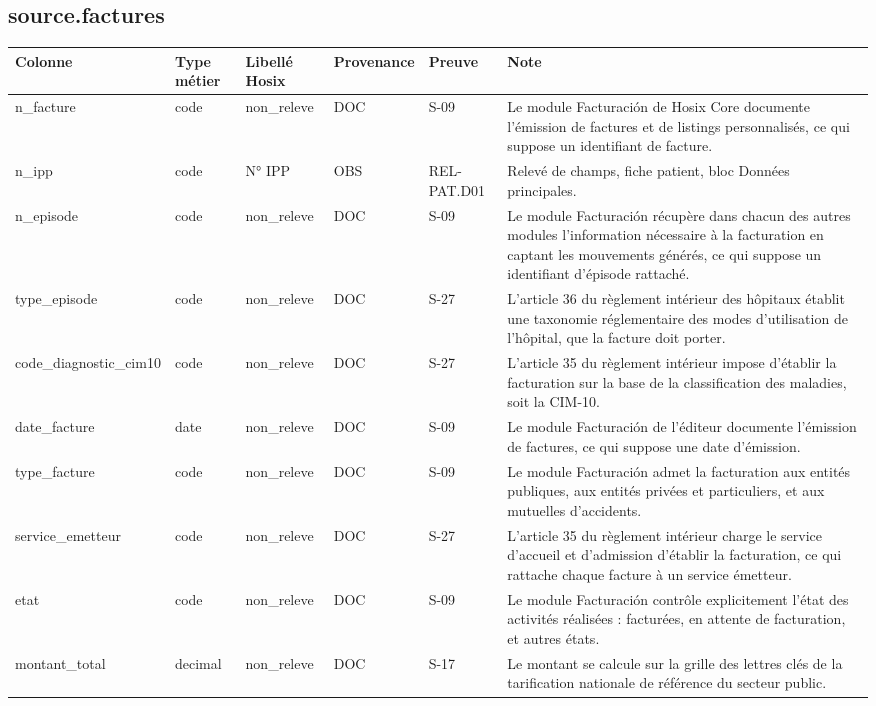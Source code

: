 \subsection*{source.factures}
\begin{longtable}{p{2.5cm}p{1.8cm}p{2.8cm}p{1.3cm}p{2.2cm}p{5cm}}
\hline
Colonne & Type métier & Libellé Hosix & Provenance & Preuve & Note \\
\hline
\endhead
n\_facture & code & non\_releve & DOC & S-09 & Le module Facturación de Hosix Core documente l'émission de factures et de listings personnalisés, ce qui suppose un identifiant de facture. \\
n\_ipp & code & N° IPP & OBS & REL-PAT.D01 & Relevé de champs, fiche patient, bloc Données principales. \\
n\_episode & code & non\_releve & DOC & S-09 & Le module Facturación récupère dans chacun des autres modules l'information nécessaire à la facturation en captant les mouvements générés, ce qui suppose un identifiant d'épisode rattaché. \\
type\_episode & code & non\_releve & DOC & S-27 & L'article 36 du règlement intérieur des hôpitaux établit une taxonomie réglementaire des modes d'utilisation de l'hôpital, que la facture doit porter. \\
code\_diagnostic\_cim10 & code & non\_releve & DOC & S-27 & L'article 35 du règlement intérieur impose d'établir la facturation sur la base de la classification des maladies, soit la CIM-10. \\
date\_facture & date & non\_releve & DOC & S-09 & Le module Facturación de l'éditeur documente l'émission de factures, ce qui suppose une date d'émission. \\
type\_facture & code & non\_releve & DOC & S-09 & Le module Facturación admet la facturation aux entités publiques, aux entités privées et particuliers, et aux mutuelles d'accidents. \\
service\_emetteur & code & non\_releve & DOC & S-27 & L'article 35 du règlement intérieur charge le service d'accueil et d'admission d'établir la facturation, ce qui rattache chaque facture à un service émetteur. \\
etat & code & non\_releve & DOC & S-09 & Le module Facturación contrôle explicitement l'état des activités réalisées : facturées, en attente de facturation, et autres états. \\
montant\_total & decimal & non\_releve & DOC & S-17 & Le montant se calcule sur la grille des lettres clés de la tarification nationale de référence du secteur public. \\

\end{longtable}
